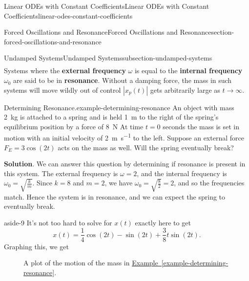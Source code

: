 \documentclass[oneside,10pt,]{book}
\newcommand{\terminology}[1]{\textbf{#1}}
\numberwithin{equation}{section}
\begin{document}
\begin{chapterptx}{Linear ODEs with Constant Coefficients}{}{Linear ODEs with Constant Coefficients}{}{}{linear-odes-constant-coefficients}
\begin{sectionptx}{Forced Oscillations and Resonance}{}{Forced Oscillations and Resonance}{}{}{section-forced-oscillations-and-resonance}
\begin{subsectionptx}{Undamped Systems}{}{Undamped Systems}{}{}{subsection-undamped-systems}
\begin{align*}
\end{align*}
Systems where the \terminology{external frequency} \(\omega\) is equal to the \terminology{internal frequency} \(\omega_{0}\) are said to be in \terminology{resonance}. Without a damping force, the mass in such systems will move wildly out of control \(|x_{p}(t)|\) gets arbitrarily large as \(t\to\infty\).%
\begin{example}{Determining Resonance.}{example-determining-resonance}%
\hypertarget{p-250}{}%
An object with mass \SI{2}{\kilo\gram} is attached to a spring and is held \SI{1}{\meter} to the right of the spring's equilibrium position by a force of \SI{8}{\newton} At time \(t = 0\) seconds the mass is set in motion with an initial velocity of \SI{2}{\meter\per\second} to the left. Suppose an external force \(F_{E} = 3\cos(2t)\) acts on the mass as well. Will the spring eventually break?%
\par\smallskip%
\noindent\textbf{Solution}.\hypertarget{solution-36}{}\quad%
\hypertarget{p-251}{}%
We can answer this question by determining if resonance is present in this system. The external frequency is \(\omega = 2\), and the internal frequency is \(\omega_{0} = \sqrt{\frac{k}{m}}\). Since \(k = 8\) and \(m = 2\), we have \(\omega_{0} = \sqrt{\frac{8}{2}} = 2\), and so the frequencies match. Hence the system is in resonance, and we can expect the spring to eventually break.%
\end{example}
\begin{aside}{}{aside-9}%
\hypertarget{p-252}{}%
It's not too hard to solve for \(x(t)\) exactly here to get%
\begin{equation*}
x(t) = \frac{1}{4}\cos(2t) - \sin(2t) + \frac{3}{8}t\sin(2t).
\end{equation*}
Graphing this, we get%
\begin{figure}
\centering
{
}
\caption{A plot of the motion of the mass in \hyperref[example-determining-resonance]{Example~\ref{example-determining-resonance}}.\label{figure-14}}
\end{figure}
\end{aside}

\end{subsectionptx}
\end{sectionptx}
\end{chapterptx}
\end{document}

